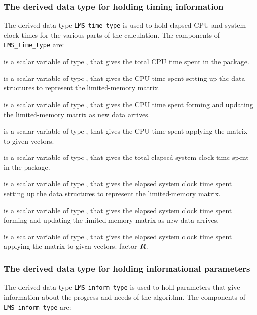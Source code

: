 \documentclass{galahad}
\newcommand{\packagename}{LMS}
\begin{document}
\subsubsection{The derived data type for holding timing
 information}\label{typetime}
The derived data type
{\tt \packagename\_time\_type}
is used to hold elapsed CPU and system clock times for the various parts of
the calculation. The components of
{\tt \packagename\_time\_type}
are:
\begin{description}
 is a scalar variable of type \realdp, that gives
 the total CPU time spent in the package.

 is a scalar variable of type \realdp, that gives
 the CPU time spent setting up the data structures to represent
 the limited-memory matrix.

 is a scalar variable of type \realdp, that gives
 the CPU time spent forming and updating the limited-memory matrix
as new data arrives.

 is a scalar variable of type \realdp, that gives
 the CPU time spent applying the matrix to given vectors.

 is a scalar variable of type \realdp, that gives
 the total elapsed system clock time spent in the package.

 is a scalar variable of type \realdp, that gives
 the elapsed system clock time spent setting up the data structures to
 represent the limited-memory matrix.

 is a scalar variable of type \realdp, that gives
 the elapsed system clock time spent forming and updating the limited-memory
 matrix as new data arrives.

 is a scalar variable of type \realdp, that gives
 the elapsed system clock time spent  applying the matrix to given vectors.
factor ${\bm{R}}$.

\end{description}


\subsubsection{The derived data type for holding informational
 parameters}\label{typeinform}
The derived data type
{\tt \packagename\_inform\_type}
is used to hold parameters that give information about the progress and needs
of the algorithm. The components of
{\tt \packagename\_inform\_type}
are:
\end{document}
